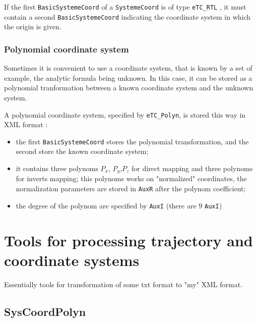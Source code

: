If the first {\tt BasicSystemeCoord} of a {\tt SystemeCoord} is of type {\tt eTC\_RTL} ,
it must contain a second {\tt BasicSystemeCoord} indicating the coordinate system
in which the origin is given.


\subsubsection{Polynomial coordinate system}

Sometimes it is convenient to use a coordinate system, that is known by a set
of example, the analytic formula being unknown. In this case, it can be stored
as a polynomial tranformation between a known coordinate system and the unknown
system.

A polynomial coordinate system, specified by {\tt eTC\_Polyn},
 is stored this way in XML format :

\begin{itemize}
   \item  the first {\tt BasicSystemeCoord} stores the polynomial transformation, and the
          second store the known coordinate system;

   \item  it contains three polynoms $P_x$, $P_y$,$P_z$ for direct mapping
          and three polynoms for inverts mapping; this polynoms works on "normalized"
          coordinates,  the normalization parameters are stored in {\tt AuxR}
          after the polynom coefficient;

   \item  the degree of the polynom are specified by {\tt AuxI} (there are $9$ {\tt AuxI})

\end{itemize}


\section{Tools for processing trajectory and coordinate systems}

Essentially tools for transformation of some txt format to "my" XML format.

\subsection{SysCoordPolyn}



